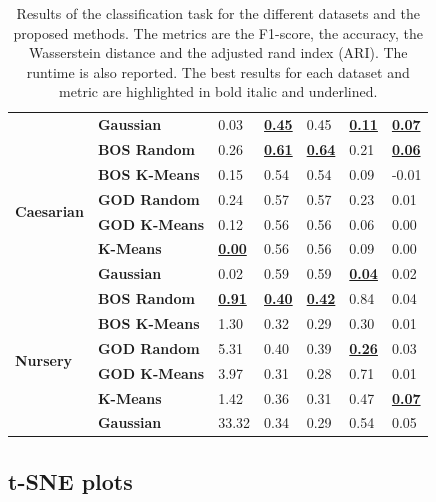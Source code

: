 \begin{table}
\begin{adjustbox}{width=\columnwidth}
\begin{tabular}{lllllll}
\textbf{} & \textbf{Gaussian} & 0.03 & \textbf{\underline{0.45}} & 0.45 & \textbf{\underline{0.11}} & \textbf{\underline{0.07}} \\
\cline{1-7}
    \multirow[t]{6}{*}{\textbf{Caesarian}} & \textbf{BOS Random} & 0.26 & \textbf{\underline{0.61}} & \textbf{\underline{0.64}} & 0.21 & \textbf{\underline{0.06}} \\
\textbf{} & \textbf{BOS K-Means} & 0.15 & 0.54 & 0.54 & 0.09 & -0.01 \\
\textbf{} & \textbf{GOD Random} & 0.24 & 0.57 & 0.57 & 0.23 & 0.01 \\
\textbf{} & \textbf{GOD K-Means} & 0.12 & 0.56 & 0.56 & 0.06 & 0.00 \\
    \textbf{} & \textbf{K-Means} & \textbf{\underline{0.00}} & 0.56 & 0.56 & 0.09 & 0.00 \\
    \textbf{} & \textbf{Gaussian} & 0.02 & 0.59 & 0.59 &\textbf{\underline{0.04}} & 0.02 \\
\cline{1-7}
    \multirow[t]{6}{*}{\textbf{Nursery}} & \textbf{BOS Random} & \textbf{\underline{0.91}} & \textbf{\underline{0.40}} & \textbf{\underline{0.42}} & 0.84 & 0.04 \\
\textbf{} & \textbf{BOS K-Means} & 1.30 & 0.32 & 0.29 & 0.30 & 0.01 \\
    \textbf{} & \textbf{GOD Random} & 5.31 & 0.40 & 0.39 & \textbf{\underline{0.26}} & 0.03 \\
\textbf{} & \textbf{GOD K-Means} & 3.97 & 0.31 & 0.28 & 0.71 & 0.01 \\
    \textbf{} & \textbf{K-Means} & 1.42 & 0.36 & 0.31 & 0.47 & \textbf{\underline{0.07}} \\
\textbf{} & \textbf{Gaussian} & 33.32 & 0.34 & 0.29 & 0.54 & 0.05 \\
\cline{1-7}
\bottomrule
\end{tabular}
\end{adjustbox}
\caption{
Results of the classification task for the different datasets and the proposed methods. The metrics are the F1-score, the accuracy, the Wasserstein distance and the adjusted rand index (ARI). 
The runtime is also reported. The best results for each dataset and metric are highlighted in bold italic and underlined. 
}
\label{tab:results_real}
\end{table}


\subsection*{t-SNE plots}
\label{sec:appendix_tsne}

